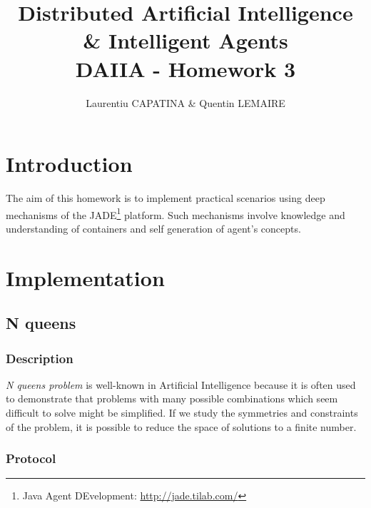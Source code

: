 \documentclass[a4paper,11pt]{article}
\title{Distributed Artificial Intelligence \& Intelligent Agents \\ DAIIA - Homework 3}
\author{Laurentiu CAPATINA \& Quentin LEMAIRE}
\begin{document}
  \maketitle %

  \section{Introduction}
  
  The aim of this homework is to implement practical scenarios using deep 
mechanisms of the JADE\footnote{Java Agent DEvelopment: \href{http://jade.tilab.com/}{http://jade.tilab.com/}} 
  platform. Such mechanisms involve knowledge and understanding of containers and self 
  generation of agent's concepts.


  \newcommand{\pa}{\textit{Profiler Agent}}
  \newcommand{\cu}{\textit{Curator Agent}}
  \renewcommand{\to}{\textit{Tour Guide Agent}}
  \newcommand{\am}{\textit{Artist Manager Agent}}
  
  \section{Implementation}
  
  \subsection{N queens}

  \subsubsection{Description}
  
  \textit{N queens problem} is well-known in Artificial Intelligence because it is often 
  used to demonstrate that problems with many possible combinations which seem difficult to solve 
  might be simplified. If we study the symmetries and constraints of the problem, it is 
  possible to reduce the space of solutions to a finite number.
  
  \subsubsection{Protocol}
  
\end{document}
